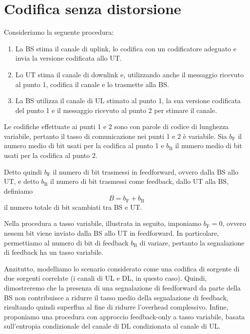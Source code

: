 \chapter{Codifica senza distorsione}

\thispagestyle{empty}

Consideriamo la seguente procedura:
\begin{enumerate}

    \item La BS stima il canale di uplink, lo codifica con un codificatore
        adeguato e invia la versione codificata allo UT.

    \item Lo UT stima il canale di downlink e, utilizzando anche il messaggio
        ricevuto al punto 1, codifica il canale e lo trasmette alla BS.

    \item La BS utilizza il canale di UL stimato al punto 1, la sua versione
        codificata del punto 1 e il messaggio ricevuto al punto 2 per stimare
        il canale.

\end{enumerate}
Le codifiche effettuate ai punti 1 e 2 sono con parole di codice di lunghezza
variabile, pertanto il tasso di comunicazione nei punti 1 e 2 è variabile. Sia
\(b_\mathrm{F}\) il numero medio di bit usati per la codifica al punto 1 e
\(b_\mathrm{B}\) il numero medio di bit usati per la codifica al punto 2.

Detto quindi \(b_\mathrm{F}\) il numero di bit trasmessi in feedforward, ovvero
dalla BS allo UT, e detto \(b_\mathrm{B}\) il numero di bit trasmessi come
feedback, dallo UT alla BS, definiamo
\[
    B = b_\mathrm{F} + b_\mathrm{B}
\]
il numero totale di bit scambiati tra BS e UT.

Nella procedura a tasso variabile, illustrata in seguito, imponiamo
\(b_\mathrm{F} = 0\), ovvero nessun bit viene inviato dalla BS allo UT in
feedforward. In particolare, permettiamo al numero di bit di feedback
\(b_\mathrm{B}\) di variare, pertanto la segnalazione di feedback ha un tasso
variabile.

Anzitutto, modelliamo lo scenario considerato come una codifica di sorgente di
due sorgenti correlate (i canali di UL e DL, in questo caso). Quindi,
dimostreremo che la presenza di una segnalazione di feedforward da parte della
BS non contribuisce a ridurre il tasso medio della segnalazione di feedback,
risultando quindi superflua al fine di ridurre l'overhead complessivo. Infine,
proponiamo una procedura con approccio feedback-only a tasso variabile, basata
sull'entropia condizionale del canale di DL condizionata al canale di UL.






